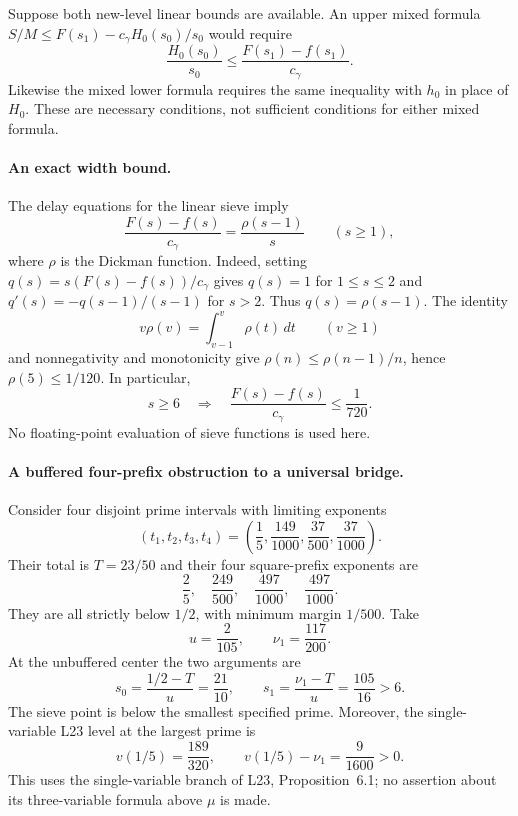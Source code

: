 \documentclass[11pt]{article}
\begin{document}
Suppose both new-level linear bounds are available. An upper mixed
formula $S/M\le F(s_1)-c_\gamma H_0(s_0)/s_0$ would require
\begin{equation}\label{eq:mixed-width-necessary-upper}
 \frac{H_0(s_0)}{s_0}
 \le \frac{F(s_1)-f(s_1)}{c_\gamma}.
\end{equation}
Likewise the mixed lower formula requires the same inequality with
$h_0$ in place of $H_0$. These are necessary conditions, not sufficient
conditions for either mixed formula.

\paragraph{An exact width bound.}
The delay equations for the linear sieve imply
\begin{equation}\label{eq:linear-width-dickman}
 \frac{F(s)-f(s)}{c_\gamma}=\frac{\rho(s-1)}{s}\qquad(s\ge1),
\end{equation}
where $\rho$ is the Dickman function. Indeed, setting
$q(s)=s(F(s)-f(s))/c_\gamma$ gives $q(s)=1$ for $1\le s\le2$ and
$q'(s)=-q(s-1)/(s-1)$ for $s>2$. Thus $q(s)=\rho(s-1)$.
The identity
\[
 v\rho(v)=\int_{v-1}^v\rho(t)\,dt\qquad(v\ge1)
\]
and nonnegativity and monotonicity give
$\rho(n)\le\rho(n-1)/n$, hence $\rho(5)\le1/120$. In particular,
\begin{equation}\label{eq:mixed-width-six}
 s\ge6\quad\Longrightarrow\quad
 \frac{F(s)-f(s)}{c_\gamma}\le\frac1{720}.
\end{equation}
No floating-point evaluation of sieve functions is used here.

\paragraph{A buffered four-prefix obstruction to a universal bridge.}
Consider four disjoint prime intervals with limiting exponents
\[
 (t_1,t_2,t_3,t_4)=
 \left(\frac15,\frac{149}{1000},\frac{37}{500},\frac{37}{1000}\right).
\]
Their total is $T=23/50$ and their four square-prefix exponents are
\[
 \frac25,\quad\frac{249}{500},\quad
 \frac{497}{1000},\quad\frac{497}{1000}.
\]
They are all strictly below $1/2$, with minimum margin $1/500$.
Take
\[
 u=\frac2{105},\qquad \nu_1=\frac{117}{200}.
\]
At the unbuffered center the two arguments are
\[
 s_0=\frac{1/2-T}{u}=\frac{21}{10},\qquad
 s_1=\frac{\nu_1-T}{u}=\frac{105}{16}>6.
\]
The sieve point is below the smallest specified prime. Moreover,
the single-variable L23 level at the largest prime is
\[
 v(1/5)=\frac{189}{320},\qquad
 v(1/5)-\nu_1=\frac9{1600}>0.
\]
This uses the single-variable branch of L23, Proposition~6.1;
no assertion about its three-variable formula above $\mu$ is made.
\end{document}
